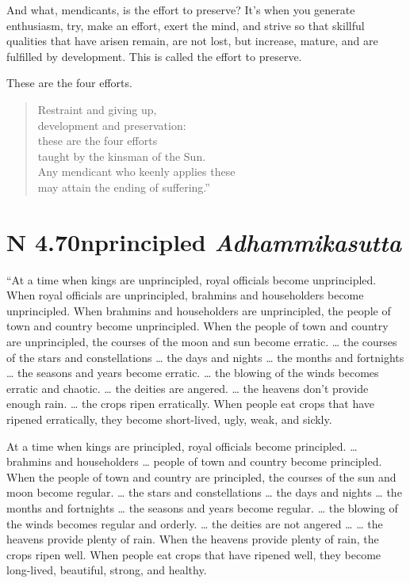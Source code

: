 \documentclass[12pt,openany]{book}%
\newcommand*{\suttatitleacronym}[1]{\smaller[2]{#1}\vspace*{.3em}}
\newcommand*{\suttatitletranslation}[1]{\linebreak{#1}}
\newcommand*{\suttatitleroot}[1]{\linebreak\smaller[2]\itshape{#1}}
\newcommand*{\tocacronym}[1]{\hspace*{-3.3em}{#1}\quad}
\newcommand*{\toctranslation}[1]{#1}
\newcommand*{\tocroot}[1]{(\textit{#1})}
\begin{document}
And what, mendicants, is the effort to preserve? It’s when you generate enthusiasm, try, make an effort, exert the mind, and strive so that skillful qualities that have arisen remain, are not lost, but increase, mature, and are fulfilled by development. This is called the effort to preserve. 

These are the four efforts. 

\begin{verse}%
Restraint and giving up, \\
development and preservation: \\
these are the four efforts \\
taught by the kinsman of the Sun. \\
Any mendicant who keenly applies these \\
may attain the ending of suffering.” 

%
\end{verse}

%
\section*{{\suttatitleacronym AN 4.70}{\suttatitletranslation Unprincipled }{\suttatitleroot Adhammikasutta}}
\addcontentsline{toc}{section}{\tocacronym{AN 4.70} \toctranslation{Unprincipled } \tocroot{Adhammikasutta}}

“At a time when kings are unprincipled, royal officials become unprincipled. When royal officials are unprincipled, brahmins and householders become unprincipled. When brahmins and householders are unprincipled, the people of town and country become unprincipled. When the people of town and country are unprincipled, the courses of the moon and sun become erratic. … the courses of the stars and constellations … the days and nights … the months and fortnights … the seasons and years become erratic. … the blowing of the winds becomes erratic and chaotic. … the deities are angered. … the heavens don’t provide enough rain. … the crops ripen erratically. When people eat crops that have ripened erratically, they become short-lived, ugly, weak, and sickly. 

At a time when kings are principled, royal officials become principled. … brahmins and householders … people of town and country become principled. When the people of town and country are principled, the courses of the sun and moon become regular. … the stars and constellations … the days and nights … the months and fortnights … the seasons and years become regular. … the blowing of the winds becomes regular and orderly. … the deities are not angered … … the heavens provide plenty of rain. When the heavens provide plenty of rain, the crops ripen well. When people eat crops that have ripened well, they become long-lived, beautiful, strong, and healthy. 
\end{document}
